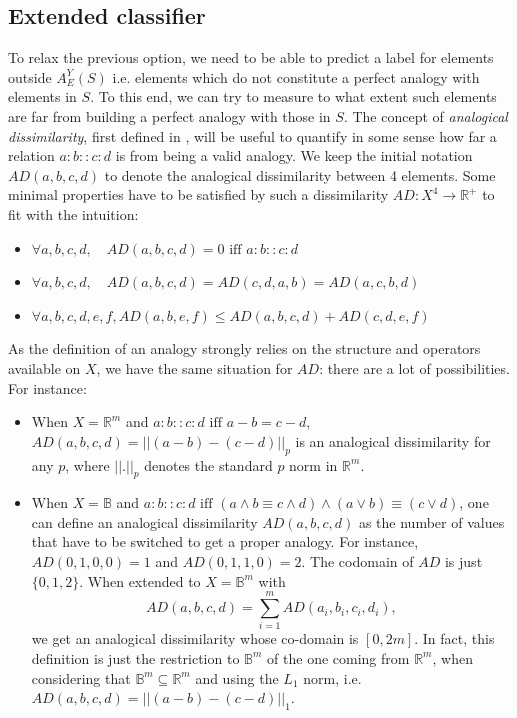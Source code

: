 {\subsection{Extended classifier}
\label{EXTENDED_LEARNER}

To relax the previous option, we need to be able to predict a label for
elements outside $A_E^Y(S)$ i.e. elements which do not constitute a perfect analogy
with elements in $S$.  To this end, we can try to measure to what extent such
elements are far from building a perfect analogy with those in $S$.
The concept of {\it analogical dissimilarity}, first  defined in
\cite{BayMicDelIJCAI07}, will be useful to  quantify in some sense how far a
relation $a:b::c:d$ is from being a valid analogy.
We keep the initial notation $AD(a,b,c,d)$ to
denote the analogical dissimilarity between 4 elements.  Some  minimal
properties have to be satisfied by such a dissimilarity $AD: X^4 \longrightarrow \mathbb{R}^+$ to fit with the intuition:
\begin{itemize}
\item $\forall a, b, c, d, \quad  AD(a,b,c,d)=0 \mbox{ iff } a:b::c:d$
\item $\forall a, b, c, d, \quad  AD(a,b,c,d)=AD(c,d,a,b)=AD(a,c,b,d)$
\item $\forall a, b, c, d, e, f,  AD(a,b,e,f) \leq AD(a,b,c,d) + AD(c,d,e,f)$
\end{itemize}
As the definition of an analogy strongly relies on the structure and operators
available on $X$, we have the same situation for $AD$: there are a lot of
possibilities. For instance:
\begin{itemize}
\item When $X=\mathbb{R}^m$ and $a:b::c:d \mbox{ iff } a-b=c-d$, $AD(a,b,c,d) =
  ||(a-b)-(c-d)||_p$ is an analogical dissimilarity for any $p$,
  where $||.||_p$ denotes the standard $p$ norm  in $\mathbb{R}^m$.
\item
When $X=\mathbb{B}$ and $a:b::c:d \mbox{ iff } (a \wedge b \equiv c
  \wedge d) \wedge (a \vee  b) \equiv (c \vee d)$, one can define an analogical
  dissimilarity $AD(a,b,c,d)$ as the number of values that have to be switched
  to get a proper analogy. For instance, $AD(0,1,0,0)=1$ and $AD(0,1,1,0)=2$.
The codomain of $AD$ is just $\{0, 1, 2\}$. When extended to
  $X=\mathbb{B}^m$ with $$AD(a,b,c,d) = \sum\limits_{i=1}^m AD(a_i,b_i,c_i,d_i),$$
  we get an analogical dissimilarity whose co-domain is $[0, 2m]$. In fact,
  this definition is just the restriction to $\mathbb{B}^m$ of the one coming
  from $\mathbb{R}^m$, when considering that $\mathbb{B}^m \subseteq
  \mathbb{R}^m$ and using the $L_1$ norm, i.e. $AD(a,b,c,d) = ||(a-b)-(c-d)||_1$.
\end{itemize}

}
